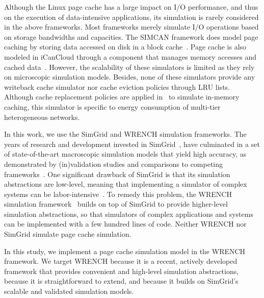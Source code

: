 \documentclass[conference]{IEEEtran}
\newcommand{\simgrid}{SimGrid\xspace}
\newcommand{\wrench}{WRENCH\xspace}
\begin{document}
        Although the Linux page cache has a large impact on I/O
        performance, and thus on the execution of data-intensive
        applications, its simulation is rarely considered in the above
        frameworks.  Most frameworks merely simulate I/O operations
        based on storage bandwidths and capacities.  The SIMCAN
        framework does model page caching by storing data accessed on
        disk in a block cache~\cite{nunez2012simcan}.  Page cache is
        also modeled in iCanCloud through a component that manages
        memory accesses and cached data~\cite{nunez2012icancloud}.
        However, the scalability of these simulators is limited
        as they rely on microscopic simulation models.  Besides, none
        of these simulators provide any writeback cache simulator nor
        cache eviction policies through LRU lists.  Although cache
        replacement policies are applied in~\cite{xu2018saving} to
        simulate in-memory caching, this simulator is specific to
        energy consumption of multi-tier heterogeneous networks.

        In this  work, we use the \simgrid and \wrench simulation
        frameworks.  The years of research and development invested in
        \simgrid~\cite{casanova2014simgrid}, have
        culminated in a set of state-of-the-art macroscopic simulation
        models that yield high accuracy, as demonstrated by
        (in)validation studies and comparisons to competing
        frameworks~\cite{smpi_validity, velhoTOMACS2013, simutool_09,
        nstools_07, lebre2015, pouilloux:hal-01197274,
        smpi_tpds2017,  7885814, 8048921, 7384330}.  One
        significant drawback of \simgrid is that its simulation
        abstractions are low-level, meaning that implementing a
        simulator of complex systems can be
        labor-intensive~\cite{kecskemeti_2014}. To remedy this problem,
        the \wrench simulation framework~\cite{casanova2020fgcs}
        builds on top of \simgrid to provide higher-level simulation
        abstractions, so that simulators of complex applications and
        systems can be implemented with a few hundred lines of code. 
        Neither \wrench nor \simgrid simulate page cache simulation.


	In this study, we implement a page cache simulation model in the
	\wrench framework. We target \wrench because it is a recent,
	actively developed framework that provides convenient and
	high-level simulation abstractions, because it is straightforward
	to extend, and because it builds on \simgrid's scalable and
	validated simulation models.
\end{document}
